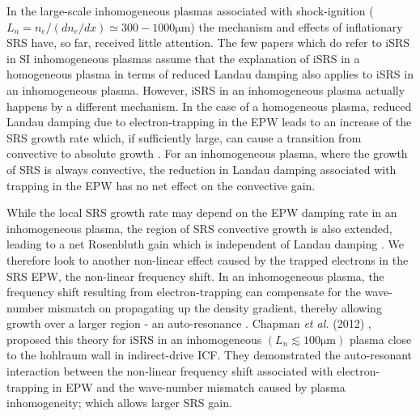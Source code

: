  In the large-scale inhomogeneous plasmas associated with shock-ignition ($L_n =n_e/(dn_e/dx) \simeq 300-1000 \si{\micro\metre}$) the mechanism and effects of inflationary SRS have, so far, received little attention. The few papers which do refer to iSRS in SI inhomogeneous plasmas assume that the explanation of iSRS in a homogeneous plasma in terms of reduced Landau damping also applies to iSRS in an inhomogeneous plasma. However, iSRS in an inhomogeneous plasma actually happens by a different mechanism. In the case of a homogeneous plasma, reduced Landau damping due to electron-trapping in the EPW leads to an increase of the SRS growth rate which, if sufficiently large, can cause a transition from convective to absolute growth \cite{Wang2018}. For an inhomogeneous plasma, where the growth of SRS is always convective, the reduction in Landau damping associated with trapping in the EPW has no net effect on the convective gain.
 
 While the local SRS growth rate may depend on the EPW damping rate in an inhomogeneous plasma, the region of SRS convective growth is also extended, leading to a net Rosenbluth gain \cite{Rosenbluth1972} which is independent of Landau damping \cite{Williams1991,Liu1994}. We therefore look to another non-linear effect caused by the trapped electrons in the SRS EPW, the non-linear frequency shift\cite{Morales1972}. In an inhomogeneous plasma, the frequency shift resulting from electron-trapping can compensate for the wave-number mismatch on propagating up the density gradient, thereby allowing
 growth over a larger region - an auto-resonance \cite{Chapman2010,Chapman2012}. Chapman {\it et al.} (2012) \cite{Chapman2012},  proposed this theory for iSRS in an inhomogeneous $(L_n \lesssim 100
 \si{\micro\metre})$ plasma close to the hohlraum wall in indirect-drive ICF. They demonstrated the auto-resonant
 interaction\cite{Chapman2010} between the non-linear frequency shift associated with electron-trapping in EPW
 and the wave-number mismatch caused by plasma inhomogeneity; which allows larger SRS gain\cite{Chapman2012}.


